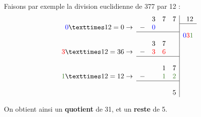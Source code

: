 \documentclass[a4paper]{article}
\begin{document}
\begin{exemple}
	Faisons par exemple la division euclidienne de 377 par 12 :
	$$
		\begin{array}{rrrrr|r}
			                                        &   & 3                   & 7                         & 7                         & 12                                                             \\
			\cline{6-6}
			\textcolor{blue}{0} × 12 = 0 \to        & - & \textcolor{blue}{0} &                           &                           &                                                                \\
			\cline{2-5}
			                                        &   &                     &                           &                           & \textcolor{blue}{0}\textcolor{red}{3}\textcolor{OliveGreen}{1} \\
			                                        &   & 3                   & 7                         &                           &                                                                \\
			\textcolor{red}{3} × 12 = 36 \to        & - & \textcolor{red}{3}  & \textcolor{red}{6}        &                           &                                                                \\
			\cline{2-5}
			                                        &   &                     &                           &                           &                                                                \\
			                                        &   &                     & 1                         & 7                         &                                                                \\
			\textcolor{OliveGreen}{1} × 12 = 12 \to & - &                     & \textcolor{OliveGreen}{1} & \textcolor{OliveGreen}{2} &                                                                \\
			\cline{2-5}
			                                        &   &                     &                           &                           &                                                                \\
			                                        &   &                     &                           & 5                         &
		\end{array}
	$$

	On obtient ainsi un \textbf{quotient} de 31, et un \textbf{reste} de 5.
\end{exemple}
\end{document}
